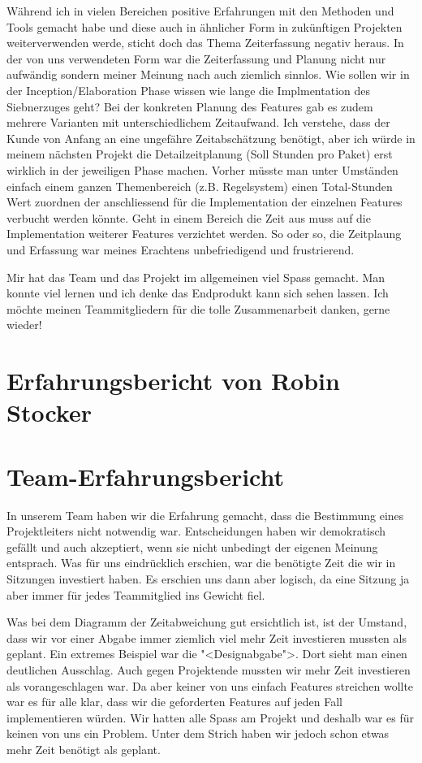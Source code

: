 \documentclass[12pt,halfparskip]{scrartcl}
\begin{document}
Während ich in vielen Bereichen positive Erfahrungen mit den Methoden und Tools gemacht habe und diese auch in ähnlicher Form in zukünftigen Projekten weiterverwenden werde, sticht doch das Thema Zeiterfassung negativ heraus. In der von uns verwendeten Form war die Zeiterfassung und Planung nicht nur aufwändig sondern meiner Meinung nach auch ziemlich sinnlos. Wie sollen wir in der Inception/Elaboration Phase wissen wie lange die Implmentation des Siebnerzuges geht? Bei der konkreten Planung des Features gab es zudem mehrere Varianten mit unterschiedlichem Zeitaufwand. Ich verstehe, dass der Kunde von Anfang an eine ungefähre Zeitabschätzung benötigt, aber ich würde in meinem nächsten Projekt die Detailzeitplanung (Soll Stunden pro Paket) erst wirklich in der jeweiligen Phase machen. Vorher müsste man unter Umständen einfach einem ganzen Themenbereich (z.B. Regelsystem) einen Total-Stunden Wert zuordnen der anschliessend für die Implementation der einzelnen Features verbucht werden könnte. Geht in einem Bereich die Zeit aus muss auf die Implementation weiterer Features verzichtet werden. So oder so, die Zeitplaung und Erfassung war meines Erachtens unbefriedigend und frustrierend.

Mir hat das Team und das Projekt im allgemeinen viel Spass gemacht. Man konnte viel lernen und ich denke das Endprodukt kann sich sehen lassen. Ich möchte meinen Teammitgliedern für die tolle Zusammenarbeit danken, gerne wieder!

\section{Erfahrungsbericht von Robin Stocker}

\section{Team-Erfahrungsbericht}
In unserem Team haben wir die Erfahrung gemacht, dass die Bestimmung eines Projektleiters nicht notwendig war. Entscheidungen haben wir demokratisch gefällt und auch akzeptiert, wenn sie nicht unbedingt der eigenen Meinung entsprach. Was für uns eindrücklich erschien, war die benötigte Zeit die wir in Sitzungen investiert haben. Es erschien uns dann aber logisch, da eine Sitzung ja aber immer für jedes Teammitglied ins Gewicht fiel.

Was bei dem Diagramm der Zeitabweichung gut ersichtlich ist, ist der Umstand, dass wir vor einer Abgabe immer ziemlich viel mehr Zeit investieren mussten als geplant. Ein extremes Beispiel war die "<Designabgabe">. Dort sieht man einen deutlichen Ausschlag. Auch gegen Projektende mussten wir mehr Zeit investieren als vorangeschlagen war. Da aber keiner von uns einfach Features streichen wollte war es für alle klar, dass wir die geforderten Features auf jeden Fall implementieren würden. Wir hatten alle Spass am Projekt und deshalb war es für keinen von uns ein Problem. Unter dem Strich haben wir jedoch schon etwas mehr Zeit benötigt als geplant.
\end{document}
